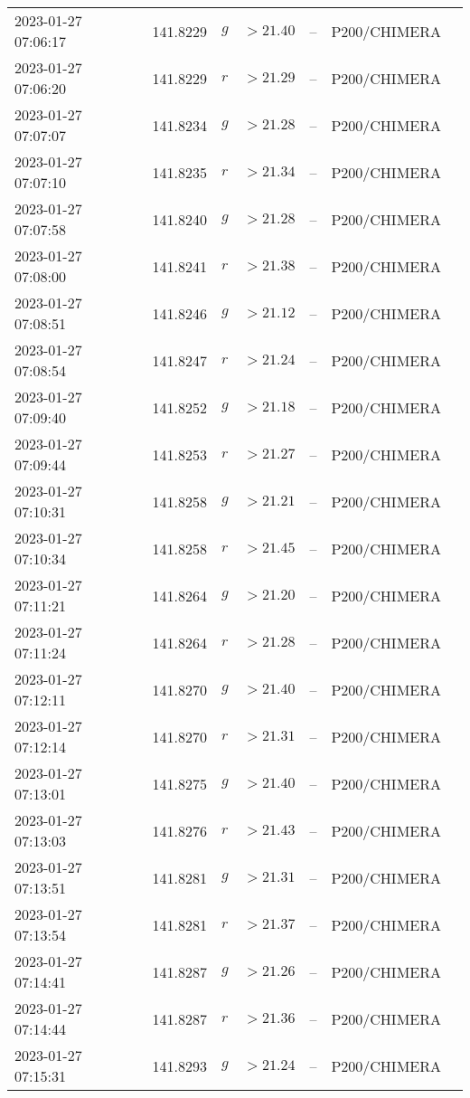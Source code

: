 \documentclass{nature_plusfigure}
\begin{document}
\begin{supplement}
\begin{center}
\begin{longtable}{lllllll}
2023-01-27 07:06:17 & 141.8229 & $g$ & $>21.40$ & -- & P200/CHIMERA &  \\ 
2023-01-27 07:06:20 & 141.8229 & $r$ & $>21.29$ & -- & P200/CHIMERA &  \\ 
2023-01-27 07:07:07 & 141.8234 & $g$ & $>21.28$ & -- & P200/CHIMERA &  \\ 
2023-01-27 07:07:10 & 141.8235 & $r$ & $>21.34$ & -- & P200/CHIMERA &  \\ 
2023-01-27 07:07:58 & 141.8240 & $g$ & $>21.28$ & -- & P200/CHIMERA &  \\ 
2023-01-27 07:08:00 & 141.8241 & $r$ & $>21.38$ & -- & P200/CHIMERA &  \\ 
2023-01-27 07:08:51 & 141.8246 & $g$ & $>21.12$ & -- & P200/CHIMERA &  \\ 
2023-01-27 07:08:54 & 141.8247 & $r$ & $>21.24$ & -- & P200/CHIMERA &  \\ 
2023-01-27 07:09:40 & 141.8252 & $g$ & $>21.18$ & -- & P200/CHIMERA &  \\ 
2023-01-27 07:09:44 & 141.8253 & $r$ & $>21.27$ & -- & P200/CHIMERA &  \\ 
2023-01-27 07:10:31 & 141.8258 & $g$ & $>21.21$ & -- & P200/CHIMERA &  \\ 
2023-01-27 07:10:34 & 141.8258 & $r$ & $>21.45$ & -- & P200/CHIMERA &  \\ 
2023-01-27 07:11:21 & 141.8264 & $g$ & $>21.20$ & -- & P200/CHIMERA &  \\ 
2023-01-27 07:11:24 & 141.8264 & $r$ & $>21.28$ & -- & P200/CHIMERA &  \\ 
2023-01-27 07:12:11 & 141.8270 & $g$ & $>21.40$ & -- & P200/CHIMERA &  \\ 
2023-01-27 07:12:14 & 141.8270 & $r$ & $>21.31$ & -- & P200/CHIMERA &  \\ 
2023-01-27 07:13:01 & 141.8275 & $g$ & $>21.40$ & -- & P200/CHIMERA &  \\ 
2023-01-27 07:13:03 & 141.8276 & $r$ & $>21.43$ & -- & P200/CHIMERA &  \\ 
2023-01-27 07:13:51 & 141.8281 & $g$ & $>21.31$ & -- & P200/CHIMERA &  \\ 
2023-01-27 07:13:54 & 141.8281 & $r$ & $>21.37$ & -- & P200/CHIMERA &  \\ 
2023-01-27 07:14:41 & 141.8287 & $g$ & $>21.26$ & -- & P200/CHIMERA &  \\ 
2023-01-27 07:14:44 & 141.8287 & $r$ & $>21.36$ & -- & P200/CHIMERA &  \\ 
2023-01-27 07:15:31 & 141.8293 & $g$ & $>21.24$ & -- & P200/CHIMERA &  \\ 

\end{longtable}
\end{center}
\end{supplement}
\end{document}
